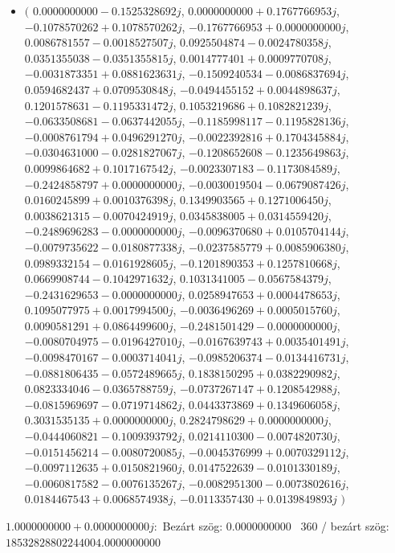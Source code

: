 \documentclass[14pt,a4paper]{article}
\begin{document}
\begin{itemize}
\item
$\big($
$0.0000000000-0.1525328692j$, $0.0000000000+0.1767766953j$, $-0.1078570262+0.1078570262j$, $-0.1767766953+0.0000000000j$, $0.0086781557-0.0018527507j$, $0.0925504874-0.0024780358j$, $0.0351355038-0.0351355815j$, $0.0014777401+0.0009770708j$, $-0.0031873351+0.0881623631j$, $-0.1509240534-0.0086837694j$, $0.0594682437+0.0709530848j$, $-0.0494455152+0.0044898637j$, $0.1201578631-0.1195331472j$, $0.1053219686+0.1082821239j$, $-0.0633508681-0.0637442055j$, $-0.1185998117-0.1195828136j$, $-0.0008761794+0.0496291270j$, $-0.0022392816+0.1704345884j$, $-0.0304631000-0.0281827067j$, $-0.1208652608-0.1235649863j$, $0.0099864682+0.1017167542j$, $-0.0023307183-0.1173084589j$, $-0.2424858797+0.0000000000j$, $-0.0030019504-0.0679087426j$, $0.0160245899+0.0010376398j$, $0.1349903565+0.1271006450j$, $0.0038621315-0.0070424919j$, $0.0345838005+0.0314559420j$, $-0.2489696283-0.0000000000j$, $-0.0096370680+0.0105704144j$, $-0.0079735622-0.0180877338j$, $-0.0237585779+0.0085906380j$, $0.0989332154-0.0161928605j$, $-0.1201890353+0.1257810668j$, $0.0669908744-0.1042971632j$, $0.1031341005-0.0567584379j$, $-0.2431629653-0.0000000000j$, $0.0258947653+0.0004478653j$, $0.1095077975+0.0017994500j$, $-0.0036496269+0.0005015760j$, $0.0090581291+0.0864499600j$, $-0.2481501429-0.0000000000j$, $-0.0080704975-0.0196427010j$, $-0.0167639743+0.0035401491j$, $-0.0098470167-0.0003714041j$, $-0.0985206374-0.0134416731j$, $-0.0881806435-0.0572489665j$, $0.1838150295+0.0382290982j$, $0.0823334046-0.0365788759j$, $-0.0737267147+0.1208542988j$, $-0.0815969697-0.0719714862j$, $0.0443373869+0.1349606058j$, $0.3031535135+0.0000000000j$, $0.2824798629+0.0000000000j$, $-0.0444060821-0.1009393792j$, $0.0214110300-0.0074820730j$, $-0.0151456214-0.0080720085j$, $-0.0045376999+0.0070329112j$, $-0.0097112635+0.0150821960j$, $0.0147522639-0.0101330189j$, $-0.0060817582-0.0076135267j$, $-0.0082951300-0.0073802616j$, $0.0184467543+0.0068574938j$, $-0.0113357430+0.0139849893j$
$\big)$
\end{itemize}
$1.0000000000+0.0000000000j$:\
Bezárt szög: $0.0000000000$ \
360 / bezárt szög: $18532828802244004.0000000000$\
\end{document}
